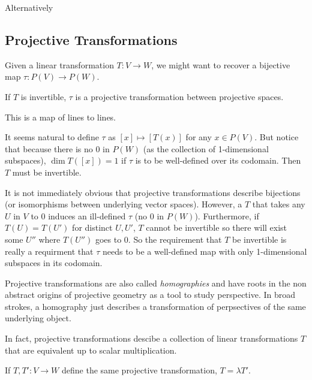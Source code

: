 \documentclass[10pt]{article}
\begin{document}
Alternatively


\subsection{Projective Transformations}

Given a linear transformation $T: V \to W$, we might want to recover a bijective map $\tau: P(V) \to P(W)$.

\begin{definition}
	If $T$ is invertible, $\tau$ is a projective transformation between
	projective spaces.
\end{definition}

This is a map of lines to lines.

It seems natural to define $\tau$ as $[x] \mapsto [T(x)]$ for any $x \in P(V)$.
But notice that because there is no $0$ in $P(W)$ (as the collection of 1-dimensional subspaces), 
$\dim T([x]) = 1$ if $\tau$ is to be well-defined over its codomain. Then $T$
must be invertible.

\begin{note}
	It is not immediately obvious that projective transformations describe
	bijections (or isomorphisms between underlying vector spaces). However, a $T$
	that takes any $U$ in $V$ to $0$ induces an ill-defined $\tau$ (no $0$ in
	$P(W)$). Furthermore, if $T(U) = T(U')$ for distinct $U, U'$, $T$ cannot be
	invertible so there will exist some $U''$ where $T(U'')$ goes to $0$. So the
	requirement that $T$ be invertible is really a requirment that $\tau$ needs
	to be a well-defined map with only 1-dimensional subspaces in its codomain.
\end{note}

\begin{note}
	Projective transformations are also called
	\textit{homographies} and have roots
	in the non abstract origins of projective geometry as a tool to study
	perspective. In broad strokes, a homography just describes a
	transformation of perpsectives of the same underlying object.
\end{note}

In fact, projective transformations descibe a collection of linear
transformations $T$ that are equivalent up to scalar multiplication.

\begin{proposition}
	If $T, T': V \to W$ define the same projective transformation, $T = \lambda T'$.
\end{proposition}
\end{document}
